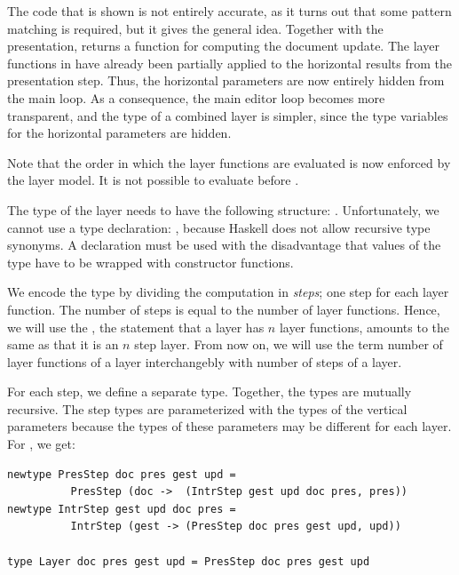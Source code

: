 \documentclass[preprint,natbib]{sigplanconf}
\begin{document}
The code that is shown is not entirely accurate, as it turns out that some pattern matching is required, but it gives the general idea. Together with the presentation,  returns a function  for computing the document update. The layer functions in  have already been partially applied to the horizontal results from the presentation step. Thus, the horizontal parameters are now entirely hidden from the main loop.  As a consequence, the main editor loop becomes more transparent, and the type of a combined layer is simpler, since the type variables for the horizontal parameters are hidden.

\bc Note that the order in which the layer functions are evaluated is now enforced by the layer model. It is not possible to evaluate  before .  \ec



The type of the layer needs to have the following structure: 
.  Unfortunately, we cannot use a type declaration: , because Haskell does not allow recursive type synonyms. A  declaration must be used with the disadvantage that values of the type have to be wrapped with constructor functions.

\bc
We encode the type by dividing the computation in {\em steps}; one step for each layer function. The number of steps is equal to the number of layer functions. Hence, we will use the , the statement that a layer has $n$ layer functions, amounts to the same as that it is an $n$ step layer. From now on, we will use the term number of layer functions of a layer interchangebly with number of steps of a layer.

For each step, we define a separate type. Together, the types are mutually recursive. The step types are parameterized with the types of the vertical parameters because the types of these parameters may be different for each layer. For , we get:

\begin{small}
\begin{verbatim}
newtype PresStep doc pres gest upd = 
          PresStep (doc ->  (IntrStep gest upd doc pres, pres))
newtype IntrStep gest upd doc pres = 
          IntrStep (gest -> (PresStep doc pres gest upd, upd)) 

type Layer doc pres gest upd = PresStep doc pres gest upd  
\end{verbatim}
\end{small}
\end{document}
